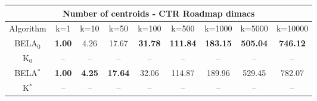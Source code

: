 \begin{tabular}{c|cccccccc}\toprule
\multicolumn{9}{c}{Number of centroids - CTR Roadmap dimacs}\\ \midrule
Algorithm & k=1 & k=10 & k=50 & k=100 & k=500 & k=1000 & k=5000 & k=10000 \\ \midrule
BELA$_0$ & \textbf{1.00} & 4.26 & 17.67 & \textbf{31.78} & \textbf{111.84} & \textbf{183.15} & \textbf{505.04} & \textbf{746.12} \\
K$_0$ & -- & -- & -- & -- & -- & -- & -- & -- \\
BELA$^*$ & \textbf{1.00} & \textbf{4.25} & \textbf{17.64} & 32.06 & 114.87 & 189.96 & 529.45 & 782.07 \\
K$^*$ & -- & -- & -- & -- & -- & -- & -- & -- \\ \bottomrule 
\end{tabular}
